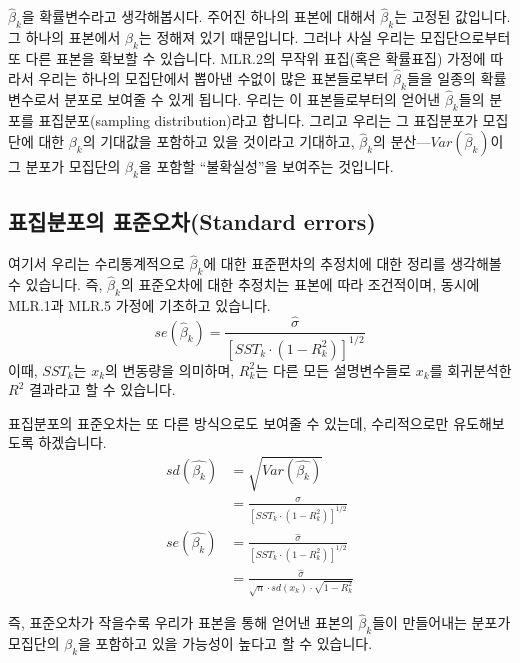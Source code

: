 \documentclass[
]{book}
\begin{document}
\(\hat{\beta}_k\)을 확률변수라고 생각해봅시다. 주어진 하나의 표본에 대해서 \(\hat{\beta}_k\)는 고정된 값입니다. 그 하나의 표본에서 \(\hat{\beta}_k\)는 정해져 있기 때문입니다. 그러나 사실 우리는 모집단으로부터 또 다른 표본을 확보할 수 있습니다. MLR.2의 무작위 표집(혹은 확률표집) 가정에 따라서 우리는 하나의 모집단에서 뽑아낸 수없이 많은 표본들로부터 \(\hat{\beta}_k\)들을 일종의 확률변수로서 분포로 보여줄 수 있게 됩니다. 우리는 이 표본들로부터의 얻어낸 \(\hat{\beta}_k\)들의 분포를 표집분포(sampling distribution)라고 합니다. 그리고 우리는 그 표집분포가 모집단에 대한 \(\beta_k\)의 기대값을 포함하고 있을 것이라고 기대하고, \(\hat{\beta}_k\)의 분산---\(Var(\hat{\beta}_k)\)이 그 분포가 모집단의 \(\beta_k\)을 포함할 ``불확실성''을 보여주는 것입니다.

\hypertarget{uxd45cuxc9d1uxbd84uxd3ecuxc758-uxd45cuxc900uxc624uxcc28standard-errors}{%
\subsection{표집분포의 표준오차(Standard errors)}\label{uxd45cuxc9d1uxbd84uxd3ecuxc758-uxd45cuxc900uxc624uxcc28standard-errors}}

여기서 우리는 수리통계적으로 \(\hat{\beta}_k\)에 대한 표준편차의 추정치에 대한 정리를 생각해볼 수 있습니다. 즉, \(\hat{\beta}_k\)의 표준오차에 대한 추정치는 표본에 따라 조건적이며, 동시에 MLR.1과 MLR.5 가정에 기초하고 있습니다.
\[se(\hat{\beta}_k) = \frac{\hat{\sigma}}{[SST_k\cdot (1-R^2_k)]^{1/2}}\]
이때, \(SST_k\)는 \(x_k\)의 변동량을 의미하며, \(R^2_k\)는 다른 모든 설명변수들로 \(x_k\)를 회귀분석한 \(R^2\) 결과라고 할 수 있습니다.

표집분포의 표준오차는 또 다른 방식으로도 보여줄 수 있는데, 수리적으로만 유도해보도록 하겠습니다.
\begin{equation*}
\begin{aligned}
sd(\hat{\beta_k})&= \sqrt{Var(\hat{\beta_k})}\\
&= \frac{\sigma}{[SST_k\cdot(1-R^2_k)]^{1/2}}\\
se(\hat{\beta_k})&= \frac{\hat{\sigma}}{[SST_k\cdot(1-R^2_k)]^{1/2}}\\
&= \frac{\hat{\sigma}}{\sqrt{n}\cdot sd(x_k)\cdot \sqrt{1-R^2_k}}
\end{aligned}
\end{equation*}

즉, 표준오차가 작을수록 우리가 표본을 통해 얻어낸 표본의 \(\hat{\beta}_k\)들이 만들어내는 분포가 모집단의 \(\beta_k\)을 포함하고 있을 가능성이 높다고 할 수 있습니다.
\end{document}
